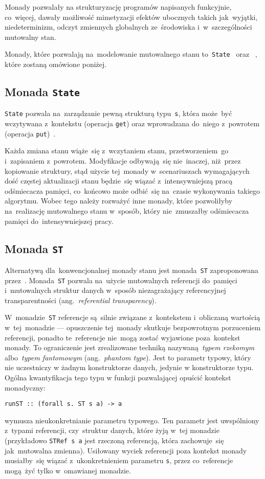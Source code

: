 \documentclass[../../thesis.tex]{subfiles}
\begin{document}
Monady pozwalały na strukturyzację programów napisanych funkcyjnie, co~więcej,
dawały możliwość mimetyzacji efektów ubocznych takich jak~wyjątki,
niedeterminizm, odczyt zmiennych globalnych ze~środowiska i~w~szczególności
mutowalny stan.

Monady, które pozwalają na~modelowanie mutowalnego stanu to~\texttt{State}~\cite{OSullivan:RWH}
oraz ~\cite{Launchbury:LFST}, które zostaną omówione poniżej.

\subsection{Monada \texttt{State}}

\texttt{State} pozwala na~zarządzanie pewną strukturą typu~\texttt{s}, która
może~być wczytywana z~kontekstu (operacja \texttt{get}) oraz wprowadzana do~niego z~powrotem
(operacja \texttt{put})~\cite{OSullivan:RWH}.

Każda zmiana stanu wiąże~się z~wczytaniem stanu, przetworzeniem~go i~zapisaniem z~powrotem.
Modyfikacje odbywają~się nie~inaczej, niż~przez kopiowanie struktury, stąd użycie tej~monady
w~scenariuszach wymagających dość częstej aktualizacji stanu będzie~się wiązać z~intensywniejszą
pracą odśmiecacza pamięci, co~końcowo może odbić~się na~czasie wykonywania takiego algorytmu.
Wobec tego należy rozważyć inne monady, które pozwoliłyby na~realizację mutowalnego stanu
w~sposób, który nie~zmuszałby odśmiecacza pamięci do~intensywniejszej pracy.

\subsection{Monada \texttt{ST}}

Alternatywą dla~konwencjonalnej monady stanu jest monada~\texttt{ST} zaproponowana
przez~\cite{Launchbury:LFST}. Monada~\texttt{ST} pozwala na~użycie mutowalnych
referencji do~pamięci i~mutowalnych struktur danych w~sposób niezagrażający
referencyjnej transparentności (ang.~\emph{referential transparency}).

W~monadzie~\texttt{ST} referencje są~silnie związane z~kontekstem i~obliczaną wartością
w~tej~monadzie --- opuszczenie tej~monady skutkuje bezpowrotnym porzuceniem referencji,
ponadto te~referencje nie~mogą zostać wyjawione poza~kontekst monady. To ograniczenie
jest zrealizowane techniką nazywaną~\emph{typem rzekomym} albo~\emph{typem fantomowym}
(ang.~\emph{phantom type}). Jest to parametr typowy, który nie uczestniczy w żadnym 
konstruktorze danych, jedynie w konstruktorze typu. Ogólna kwantyfikacja tego typu
w funkcji pozwalającej opuścić kontekst monadyczny:
\begin{verbatim}
runST :: (forall s. ST s a) -> a
\end{verbatim}
wymusza nieukonkretnianie parametru typowego. Ten parametr jest uwspólniony z~typami
referencji, czy~struktur danych, które żyją w~tej monadzie (przykładowo \texttt{STRef s a}
jest rzeczoną referencją, która zachowuje~się jak~mutowalna zmienna).
Usiłowany wyciek referencji poza kontekst monady musiałby~się wiązać z~ukonkretnieniem parametru
\texttt{s}, przez co~referencje mogą~żyć tylko w~omawianej monadzie.
\end{document}
